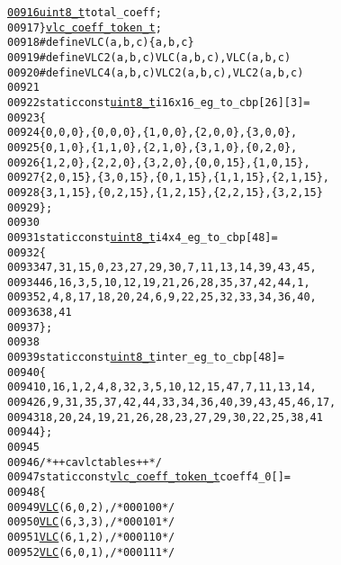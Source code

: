 \begin{footnotesize}
\begin{alltt}
\hypertarget{vlc_8h_source_l00916}{}\hyperlink{structvlc__coeff__token__t_a8f1bc5c088694aeb2e4676a3d77abc71}{00916}         \hyperlink{_types_8h_a363e4d606232036a6b89060813c45489}{uint8_t} total\_coeff;
00917 \} \hyperlink{structvlc__coeff__token__t}{vlc_coeff_token_t};
00918 \textcolor{preprocessor}{#define VLC(a, b, c) \{a, b, c\}}
00919 \textcolor{preprocessor}{}\textcolor{preprocessor}{#define VLC2(a, b, c) VLC(a, b, c), VLC(a, b, c)}
00920 \textcolor{preprocessor}{}\textcolor{preprocessor}{#define VLC4(a, b, c) VLC2(a, b, c), VLC2(a, b, c)}
00921 \textcolor{preprocessor}{}
00922 \textcolor{keyword}{static} \textcolor{keyword}{const} \hyperlink{_types_8h_a363e4d606232036a6b89060813c45489}{uint8_t} i16x16\_eg\_to\_cbp[26][3] = 
00923 \{
00924         \{0, 0, 0\}, \{0, 0, 0\}, \{1, 0, 0\}, \{2, 0, 0\}, \{3, 0, 0\},
00925         \{0, 1, 0\}, \{1, 1, 0\}, \{2, 1, 0\}, \{3, 1, 0\}, \{0, 2, 0\}, 
00926         \{1, 2, 0\}, \{2, 2, 0\}, \{3, 2, 0\}, \{0, 0,15\}, \{1, 0,15\}, 
00927         \{2, 0,15\}, \{3, 0,15\}, \{0, 1,15\}, \{1, 1,15\}, \{2, 1,15\}, 
00928         \{3, 1,15\}, \{0, 2,15\}, \{1, 2,15\}, \{2, 2,15\}, \{3, 2,15\}
00929 \};
00930 
00931 \textcolor{keyword}{static} \textcolor{keyword}{const} \hyperlink{_types_8h_a363e4d606232036a6b89060813c45489}{uint8_t} i4x4\_eg\_to\_cbp[48] =
00932 \{
00933         47, 31, 15, 0, 23, 27, 29, 30, 7, 11, 13, 14, 39, 43, 45,
00934         46, 16, 3, 5, 10, 12, 19, 21, 26, 28, 35, 37, 42, 44, 1,
00935         2, 4, 8, 17, 18, 20, 24, 6, 9, 22, 25, 32, 33, 34, 36, 40,
00936         38, 41
00937 \};
00938 
00939 \textcolor{keyword}{static} \textcolor{keyword}{const} \hyperlink{_types_8h_a363e4d606232036a6b89060813c45489}{uint8_t} inter\_eg\_to\_cbp[48] = 
00940 \{
00941         0, 16, 1, 2, 4, 8, 32, 3, 5, 10, 12, 15, 47, 7, 11, 13, 14,
00942         6, 9, 31, 35, 37, 42, 44, 33, 34, 36, 40, 39, 43, 45, 46, 17,
00943         18, 20, 24, 19, 21, 26, 28, 23, 27, 29, 30, 22, 25, 38, 41
00944 \};
00945 
00946 \textcolor{comment}{/* ++ cavlc tables ++ */}
00947 \textcolor{keyword}{static} \textcolor{keyword}{const} \hyperlink{structvlc__coeff__token__t}{vlc_coeff_token_t} coeff4\_0[] = 
00948 \{
00949         \hyperlink{vlc_8h_a7f3572774a720fd9b4bc3b1a0b65082f}{VLC}(6, 0, 2),   \textcolor{comment}{/* 0001 00 */}
00950         \hyperlink{vlc_8h_a7f3572774a720fd9b4bc3b1a0b65082f}{VLC}(6, 3, 3),   \textcolor{comment}{/* 0001 01 */}
00951         \hyperlink{vlc_8h_a7f3572774a720fd9b4bc3b1a0b65082f}{VLC}(6, 1, 2),   \textcolor{comment}{/* 0001 10 */}
00952         \hyperlink{vlc_8h_a7f3572774a720fd9b4bc3b1a0b65082f}{VLC}(6, 0, 1),   \textcolor{comment}{/* 0001 11 */}

\end{alltt}
\end{footnotesize}
